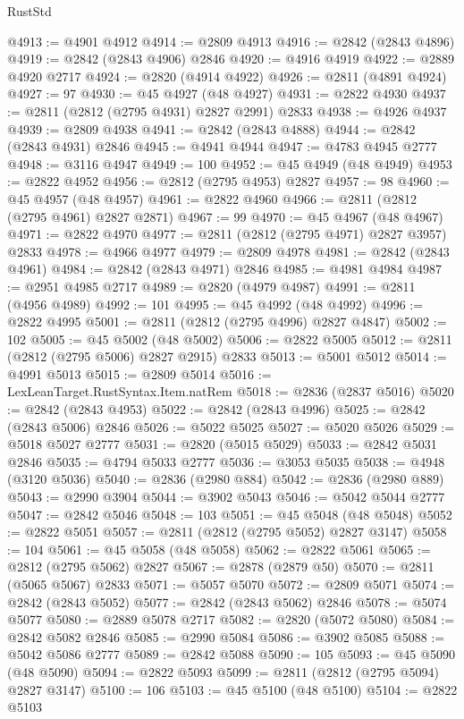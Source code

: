 \begin{lexlean}{RustStd}
\begin{coremodule}
@4913 := @4901 @4912
@4914 := @2809 @4913
@4916 := @2842 (@2843 @4896)
@4919 := @2842 (@2843 @4906) @2846
@4920 := @4916 @4919
@4922 := @2889 @4920 @2717
@4924 := @2820 (@4914 @4922)
@4926 := @2811 (@4891 @4924)
@4927 := 97
@4930 := @45 @4927 (@48 @4927)
@4931 := @2822 @4930
@4937 := @2811 (@2812 (@2795 @4931) @2827 @2991) @2833
@4938 := @4926 @4937
@4939 := @2809 @4938
@4941 := @2842 (@2843 @4888)
@4944 := @2842 (@2843 @4931) @2846
@4945 := @4941 @4944
@4947 := @4783 @4945 @2777
@4948 := @3116 @4947
@4949 := 100
@4952 := @45 @4949 (@48 @4949)
@4953 := @2822 @4952
@4956 := @2812 (@2795 @4953) @2827
@4957 := 98
@4960 := @45 @4957 (@48 @4957)
@4961 := @2822 @4960
@4966 := @2811 (@2812 (@2795 @4961) @2827 @2871)
@4967 := 99
@4970 := @45 @4967 (@48 @4967)
@4971 := @2822 @4970
@4977 := @2811 (@2812 (@2795 @4971) @2827 @3957) @2833
@4978 := @4966 @4977
@4979 := @2809 @4978
@4981 := @2842 (@2843 @4961)
@4984 := @2842 (@2843 @4971) @2846
@4985 := @4981 @4984
@4987 := @2951 @4985 @2717
@4989 := @2820 (@4979 @4987)
@4991 := @2811 (@4956 @4989)
@4992 := 101
@4995 := @45 @4992 (@48 @4992)
@4996 := @2822 @4995
@5001 := @2811 (@2812 (@2795 @4996) @2827 @4847)
@5002 := 102
@5005 := @45 @5002 (@48 @5002)
@5006 := @2822 @5005
@5012 := @2811 (@2812 (@2795 @5006) @2827 @2915) @2833
@5013 := @5001 @5012
@5014 := @4991 @5013
@5015 := @2809 @5014
@5016 := LexLeanTarget.RustSyntax.Item.natRem
@5018 := @2836 (@2837 @5016)
@5020 := @2842 (@2843 @4953)
@5022 := @2842 (@2843 @4996)
@5025 := @2842 (@2843 @5006) @2846
@5026 := @5022 @5025
@5027 := @5020 @5026
@5029 := @5018 @5027 @2777
@5031 := @2820 (@5015 @5029)
@5033 := @2842 @5031 @2846
@5035 := @4794 @5033 @2777
@5036 := @3053 @5035
@5038 := @4948 (@3120 @5036)
@5040 := @2836 (@2980 @884)
@5042 := @2836 (@2980 @889)
@5043 := @2990 @3904
@5044 := @3902 @5043
@5046 := @5042 @5044 @2777
@5047 := @2842 @5046
@5048 := 103
@5051 := @45 @5048 (@48 @5048)
@5052 := @2822 @5051
@5057 := @2811 (@2812 (@2795 @5052) @2827 @3147)
@5058 := 104
@5061 := @45 @5058 (@48 @5058)
@5062 := @2822 @5061
@5065 := @2812 (@2795 @5062) @2827
@5067 := @2878 (@2879 @50)
@5070 := @2811 (@5065 @5067) @2833
@5071 := @5057 @5070
@5072 := @2809 @5071
@5074 := @2842 (@2843 @5052)
@5077 := @2842 (@2843 @5062) @2846
@5078 := @5074 @5077
@5080 := @2889 @5078 @2717
@5082 := @2820 (@5072 @5080)
@5084 := @2842 @5082 @2846
@5085 := @2990 @5084
@5086 := @3902 @5085
@5088 := @5042 @5086 @2777
@5089 := @2842 @5088
@5090 := 105
@5093 := @45 @5090 (@48 @5090)
@5094 := @2822 @5093
@5099 := @2811 (@2812 (@2795 @5094) @2827 @3147)
@5100 := 106
@5103 := @45 @5100 (@48 @5100)
@5104 := @2822 @5103

\end{coremodule}
\end{lexlean}
